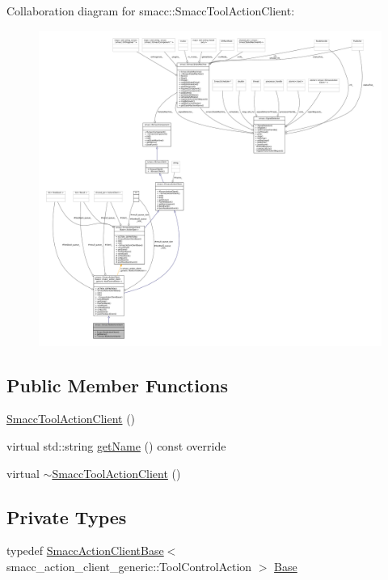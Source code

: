 Collaboration diagram for smacc\+:\+:Smacc\+Tool\+Action\+Client\+:
\nopagebreak
\begin{figure}[H]
\begin{center}
\leavevmode
\includegraphics[width=350pt]{classsmacc_1_1SmaccToolActionClient__coll__graph}
\end{center}
\end{figure}
\subsection*{Public Member Functions}
\begin{DoxyCompactItemize}
\item 
\hyperlink{classsmacc_1_1SmaccToolActionClient_aaee72ed9efa31a889d6fa66aa204a5c1}{Smacc\+Tool\+Action\+Client} ()
\item 
virtual std\+::string \hyperlink{classsmacc_1_1SmaccToolActionClient_a07ee35b66e8e8e28c9e39052835515c9}{get\+Name} () const override
\item 
virtual \hyperlink{classsmacc_1_1SmaccToolActionClient_a5795339a373ad22bc77b21970503ad91}{$\sim$\+Smacc\+Tool\+Action\+Client} ()
\end{DoxyCompactItemize}
\subsection*{Private Types}
\begin{DoxyCompactItemize}
\item 
typedef \hyperlink{classsmacc_1_1SmaccActionClientBase}{Smacc\+Action\+Client\+Base}$<$ smacc\+\_\+action\+\_\+client\+\_\+generic\+::\+Tool\+Control\+Action $>$ \hyperlink{classsmacc_1_1SmaccToolActionClient_a726d5c203f444e54084b77260b51c7ae}{Base}
\end{DoxyCompactItemize}
